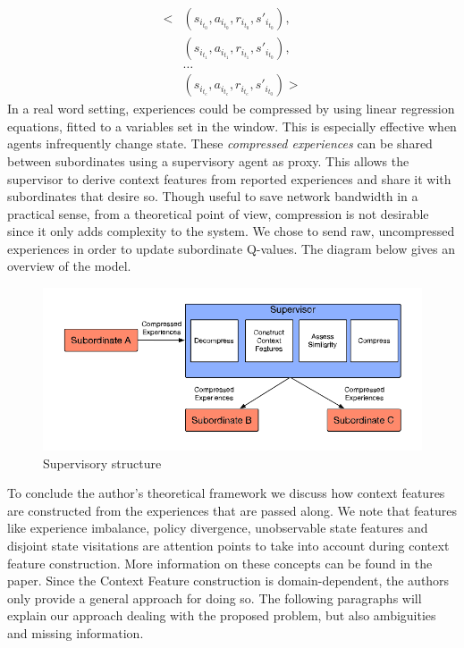 \documentclass[letterpaper]{article}
\begin{document}
\begin{align*}
 \biggl<
  & (s_{i_{t_0}},a_{i_{t_0}},r_{i_{t_0}},s'_{i_{t_0}}), \\
  & (s_{i_{t_1}},a_{i_{t_1}},r_{i_{t_1}},s'_{i_{t_0}}), \\
  & \hdots                                              \\
  & (s_{i_{t_e}},a_{i_{t_e}},r_{i_{t_e}},s'_{i_{t_0}})
 \biggr>
\end{align*}
In a real word setting, experiences could be compressed by using linear regression equations, fitted to a variables set in the window. This is especially effective when agents infrequently change state. These \textit{compressed experiences} can be shared between subordinates using a supervisory agent as proxy. This allows the supervisor to derive context features from reported experiences and share it with subordinates that desire so. Though useful to save network bandwidth in a practical sense, from a theoretical point of view, compression is not desirable since it only adds complexity to the system. We chose to send raw, uncompressed experiences in order to update subordinate Q-values. The diagram below gives an overview of the model.
\begin{figure}[ht]
 \begin{center}
  \includegraphics[width=\linewidth]{figures/diagram}
  \caption{Supervisory structure \citep{garant2015accelerating}}
  \label{fig:diagram}
 \end{center}
\end{figure}
To conclude the author’s theoretical framework we discuss how context features are constructed from the experiences that are passed along. We note that features like experience imbalance, policy divergence, unobservable state features and disjoint state visitations are attention points to take into account during context feature construction. More information on these concepts can be found in the paper. Since the Context Feature construction is domain-dependent, the authors only provide a general approach for doing so. The following paragraphs will explain our approach dealing with the proposed problem, but also ambiguities and missing information.
\end{document}

